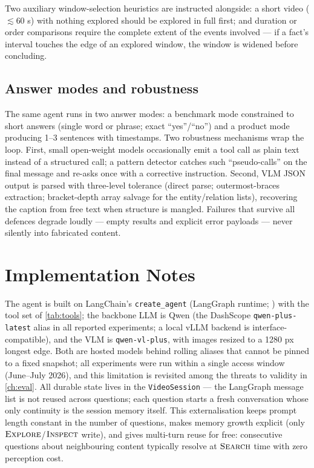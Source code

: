 Two auxiliary window-selection heuristics are instructed alongside: a short video ($\lesssim$60 s)
with nothing explored should be explored in full first; and duration or order comparisons require
the complete extent of the events involved --- if a fact's interval touches the edge of an explored
window, the window is widened before concluding.

\subsection{Answer modes and robustness}
\label{subsec:modes}

The same agent runs in two answer modes: a benchmark mode constrained to short answers (single
word or phrase; exact ``yes''/``no'') and a product mode producing 1--3 sentences with timestamps.
Two robustness mechanisms wrap the loop. First, small open-weight models occasionally emit a
tool call as plain text instead of a structured call; a pattern detector catches such
``pseudo-calls'' on the final message and re-asks once with a corrective instruction. Second, VLM
JSON output is parsed with three-level tolerance (direct parse; outermost-braces extraction;
bracket-depth array salvage for the entity/relation lists), recovering the caption from free text
when structure is mangled. Failures that survive all defences degrade loudly --- empty results and
explicit error payloads --- never silently into fabricated content.

\section{Implementation Notes}
\label{sec:impl}

The agent is built on LangChain's \texttt{create\_agent} (LangGraph runtime; \cite{langchain2022}) with the tool
set of \cref{tab:tools}; the backbone LLM is Qwen (the DashScope \texttt{qwen-plus-latest} alias in all
reported experiments; a local vLLM backend is interface-compatible), and the VLM is
\texttt{qwen-vl-plus}, with images resized to a 1280 px longest edge. Both are hosted models behind
rolling aliases that cannot be pinned to a fixed snapshot; all experiments were run within a
single access window (June--July 2026), and this limitation is revisited among the threats to
validity in \cref{ch:eval}. All durable state lives in the \texttt{VideoSession} --- the LangGraph message list
is not reused across questions; each question starts a fresh conversation whose only continuity
is the session memory itself. This externalisation keeps prompt length constant in the number of
questions, makes memory growth explicit (only $\textsc{Explore}$/$\textsc{Inspect}$ write), and
gives multi-turn reuse for free: consecutive questions about neighbouring content typically
resolve at $\textsc{Search}$ time with zero perception cost.

